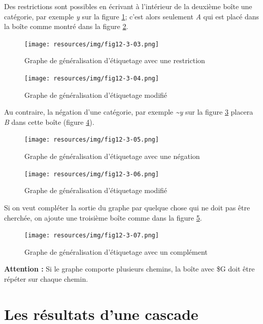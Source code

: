 \noindent Des restrictions sont possibles en \'{e}crivant \`{a} l'int\'{e}rieur de la deuxi\`{e}me bo\^{i}te une cat\'{e}gorie, par exemple \textit{y} sur la figure \ref{fig12-3-03}; c'est alors seulement \textit{A} qui est placé dans la bo\^{i}te comme montr\'{e} dans la figure \ref{fig12-3-04}.
\begin{figure}[!htb]
  \centering
  \texttt{[image: resources/img/fig12-3-03.png]}
  \caption{Graphe de g\'{e}n\'{e}ralisation d'\'{e}tiquetage avec une restriction}
  \label{fig12-3-03}
\end{figure}

\begin{figure}[!htb]
  \centering
  \texttt{[image: resources/img/fig12-3-04.png]}
  \caption{Graphe de g\'{e}n\'{e}ralisation d'\'{e}tiquetage modifi\'{e}}
  \label{fig12-3-04}
\end{figure}

\noindent Au contraire, la n\'{e}gation d'une cat\'{e}gorie, par exemple \textit{\textasciitilde y} sur la figure \ref{fig12-3-05} placera \textit{B} dans cette bo\^{i}te (figure \ref{fig12-3-06}).
\begin{figure}[!htb]
  \centering
  \texttt{[image: resources/img/fig12-3-05.png]}
  \caption{Graphe de g\'{e}n\'{e}ralisation d'\'{e}tiquetage avec une n\'{e}gation}
  \label{fig12-3-05}
\end{figure}

\begin{figure}[!htb]
  \centering
  \texttt{[image: resources/img/fig12-3-06.png]}
  \caption{Graphe de g\'{e}n\'{e}ralisation d'\'{e}tiquetage modifi\'{e}}
  \label{fig12-3-06}
\end{figure}

Si on veut compl\'{e}ter la sortie du graphe par quelque chose qui ne doit pas \^{e}tre cherch\'{e}e, on ajoute une troisi\`{e}me bo\^{i}te comme dans la figure \ref{fig12-3-07}.
\begin{figure}[!htb]
  \centering
  \texttt{[image: resources/img/fig12-3-07.png]}
  \caption{Graphe de g\'{e}n\'{e}ralisation d'\'{e}tiquetage avec un compl\'{e}ment}
  \label{fig12-3-07}
\end{figure}

\large{\textbf{Attention :}}  Si le graphe comporte plusieurs chemins, la bo\^{i}te avec \$G doit être répéter sur chaque chemin.

\section{Les résultats d'une cascade}

